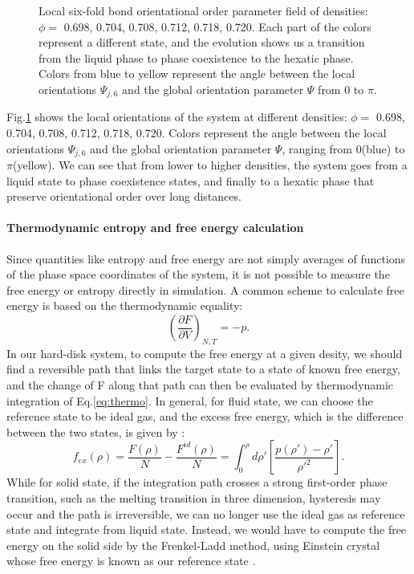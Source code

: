 \documentclass[a4paper]{article}
\begin{document}
\begin{figure}[ht]
\begin{subfigure}[ht]{.33\textwidth}
	\end{subfigure}
	\caption{
		Local six-fold bond orientational order parameter field of densities: $\phi =$ 0.698, 0.704, 0.708, 0.712, 0.718, 0.720. Each part of the colors represent a different state, and the evolution shows us a transition from the liquid phase to phase coexistence to the hexatic phase. Colors from blue to yellow represent the angle between the local orientations $\Psi_{j,6}$ and the global orientation parameter $\Psi$ from $0$ to $\pi$. 
	}
	\label{fig:psi6}
\end{figure}

Fig.\ref{fig:psi6} shows the local orientations of the system at different densities: $\phi =$ 0.698, 0.704, 0.708, 0.712, 0.718, 0.720. Colors represent the angle between the local orientations $\Psi_{j,6}$ and the global orientation parameter $\Psi$, ranging from $0$(blue) to $\pi$(yellow). We can see that from lower to higher densities, the system goes from a liquid state to phase coexistence states, and finally to a hexatic phase that preserve orientational order over long distances.


\paragraph{Thermodynamic entropy and free energy calculation}

Since quantities like entropy and free energy are not simply averages of functions of the phase space coordinates of the system, it is not possible to measure the free energy or entropy directly in simulation. A common scheme to calculate free energy is based on the thermodynamic equality:
\begin{equation} \label{eq:thermo}
\left(\frac{\partial F}{\partial V}\right)_{N,T} = -p.
\end{equation}
In our hard-disk system, to compute the free energy at a given desity, we should find a reversible path that links the target state to a state of known free energy, and the change of F along that path can then be evaluated by thermodynamic integration of Eq.\ref{eq:thermo}. In general, for fluid state, we can choose the reference state to be ideal gas, and the excess free energy, which is the difference between the two states, is given by \cite{PhysRevE.93.012906}:
\begin{equation} \label{eq:F}
f_{ex}(\rho) = \frac{F(\rho)}{N} - \frac{F^{id}(\rho)}{N} = \int_{0}^{\rho} d\rho'\left[\frac{p(\rho') - \rho'}{\rho'^2}\right].
\end{equation}
While for solid state, if the integration path crosses a strong first-order phase transition, such as the melting transition in three dimension, hysteresis may occur and the path is irreversible, we can no longer use the ideal gas as reference state and integrate from liquid state. Instead, we would have to compute the free energy on the solid side by the Frenkel-Ladd method, using Einstein crystal whose free energy is known as our reference state \cite{frenkel2001understanding}.
\end{document}
